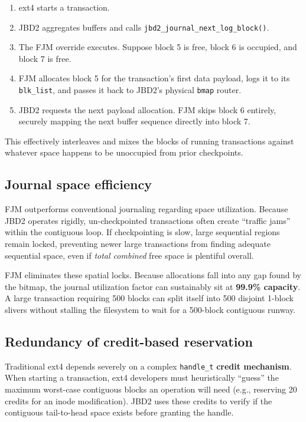 \documentclass[12pt,a4paper]{article}
\begin{document}
\begin{enumerate}[leftmargin=*]
    \item ext4 starts a transaction.
    \item JBD2 aggregates buffers and calls
          \texttt{jbd2\_journal\_next\_log\_block()}.
    \item The FJM override executes. Suppose block 5 is free,
          block 6 is occupied, and block 7 is free.
    \item FJM allocates block 5 for the transaction's first data
          payload, logs it to its \texttt{blk\_list}, and passes
          it back to JBD2's physical \texttt{bmap} router.
    \item JBD2 requests the next payload allocation. FJM skips
          block 6 entirely, securely mapping the next buffer
          sequence directly into block 7.
\end{enumerate}

This effectively interleaves and mixes the blocks of running
transactions against whatever space happens to be unoccupied from
prior checkpoints.

\subsection{Journal space efficiency}

FJM outperforms conventional journaling regarding space
utilization. Because JBD2 operates rigidly, un-checkpointed
transactions often create ``traffic jams'' within the contiguous
loop. If checkpointing is slow, large sequential regions remain
locked, preventing newer large transactions from finding adequate
sequential space, even if \textit{total combined} free space is
plentiful overall.

FJM eliminates these spatial locks. Because allocations fall into
any gap found by the bitmap, the journal utilization factor can
sustainably sit at \textbf{99.9\% capacity}. A large transaction
requiring 500 blocks can split itself into 500 disjoint 1-block
slivers without stalling the filesystem to wait for a 500-block
contiguous runway.

\subsection{Redundancy of credit-based reservation}

Traditional ext4 depends severely on a complex
\texttt{handle\_t} \textbf{credit mechanism}. When starting a
transaction, ext4 developers must heuristically ``guess'' the
maximum worst-case contiguous blocks an operation will need (e.g.,
reserving 20 credits for an inode modification). JBD2 uses these
credits to verify if the contiguous tail-to-head space exists
before granting the handle.
\end{document}
